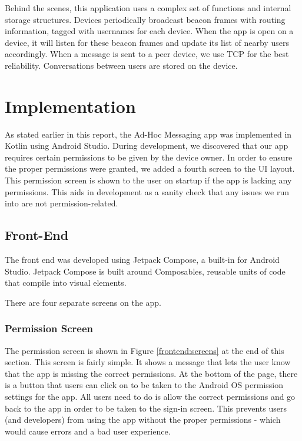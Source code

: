\documentclass[10pt]{article}
\begin{document}
Behind the scenes, this application uses a complex set of functions and internal storage structures. Devices  periodically broadcast beacon frames with routing information, tagged with usernames for each device. When the app is open on a device, it will listen for these beacon frames and update its list of nearby users accordingly. When a message is sent to a peer device, we use TCP for the best reliability. Conversations between users are stored on the device.

\section{Implementation}

As stated earlier in this report, the Ad-Hoc Messaging app was implemented in Kotlin using Android Studio. During development, we discovered that our app requires certain permissions to be given by the device owner. In order to ensure the proper permissions were granted, we added a fourth screen to the UI layout. This permission screen is shown to the user on startup if the app is lacking any permissions. This aids in development as a sanity check that any issues we run into are not permission-related.

\subsection{Front-End}

The front end was developed using Jetpack Compose, a built-in for Android Studio. Jetpack Compose is built around Composables, reusable units of code that compile into visual elements.

There are four separate screens on the app. 

\subsubsection{Permission Screen}

The permission screen is shown in Figure \ref{frontend:screens} at the end of this section. This screen is fairly simple. It shows a message that lets the user know that the app is missing the correct permissions. At the bottom of the page, there is a button that users can click on to be taken to the Android OS permission settings for the app. All users need to do is allow the correct permissions and go back to the app in order to be taken to the sign-in screen. This prevents users (and developers) from using the app without the proper permissions - which would cause errors and a bad user experience.
\end{document}
